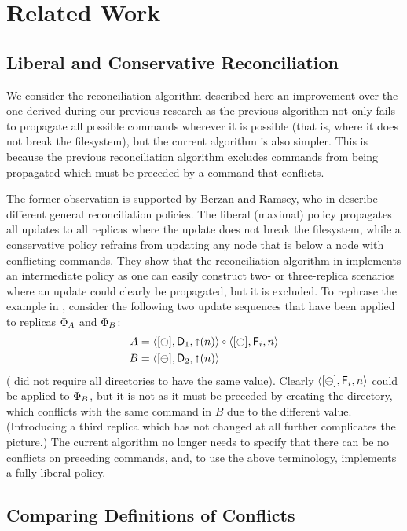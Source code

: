 
\section{Related Work}

\subsection{Liberal and Conservative Reconciliation}

We consider the reconciliation algorithm described here an improvement over
the one derived during our previous research \cite{NREC}
as the previous algorithm not only fails to propagate all possible commands
wherever it is possible (that is, where it does not break the filesystem),
but the current algorithm is also simpler.
This is because the previous reconciliation algorithm excludes
commands from being propagated which must be preceded by a command that conflicts.

The former observation is supported by Berzan and Ramsey, who in \cite{CBNR} 
describe different general reconciliation policies.
The liberal (maximal) policy propagates all updates to all replicas where
the update does not break the filesystem, while a conservative policy
refrains from updating any node that is below a node with conflicting commands.
They show that the reconciliation algorithm in \cite{NREC} implements
an intermediate policy as one can easily construct two- or three-replica scenarios
where an update could clearly be propagated, but it is excluded.
To rephrase the example in \cite{CBNR}, consider the following two
update sequences that have been applied to replicas $\Phi_A$ and $\Phi_B$:
\begin{align*}
A&=\caaa{\empt}{\valdi}{\pn}\cc\caaa{\empt}{\valf}{n} \\
B&=\caaa{\empt}{\valdii}{\pn}
\end{align*}
(\cite{NREC} did not require all directories to have the same value).
Clearly $\langle{[\ominus],\mathsf{F}_i,n}\rangle$ could be applied to $\Phi_B$, but it is not as
it must be preceded by creating the directory, which conflicts with the same command in $B$
due to the different value.
(Introducing a third replica which has not changed at all further complicates the picture.)
The current algorithm no longer needs to specify that there can be no conflicts
on preceding commands, and, to use the above terminology, implements a fully liberal policy.


\subsection{Comparing Definitions of Conflicts}

